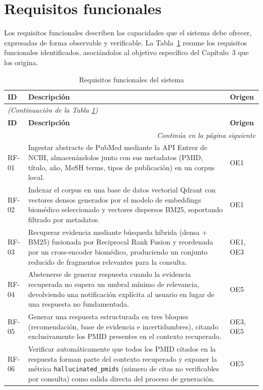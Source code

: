 \documentclass[11pt,a4paper,spanish]{book}
\numberwithin{equation}{chapter}
\numberwithin{figure}{chapter}
\begin{document}
\section{Requisitos funcionales}

Los requisitos funcionales describen las capacidades que el sistema debe ofrecer, expresadas de forma observable y verificable. La Tabla~\ref{tab:rf} resume los requisitos funcionales identificados, asociándolos al objetivo específico del Capítulo~3 que los origina.

{\small
\begin{longtable}{|p{}|p{}|p{}|}
\caption{Requisitos funcionales del sistema}
\label{tab:rf} \\
\hline
\textbf{ID} & \textbf{Descripción} & \textbf{Origen} \\
\hline
\endfirsthead
\multicolumn{3}{l}{\textit{(Continuación de la Tabla \ref{tab:rf})}} \\
\hline
\textbf{ID} & \textbf{Descripción} & \textbf{Origen} \\
\hline
\endhead
\hline
\multicolumn{3}{r}{\textit{Continúa en la página siguiente}} \\
\endfoot
\hline
\endlastfoot
RF-01 & Ingestar abstracts de PubMed mediante la API Entrez de NCBI, almacenándolos junto con sus metadatos (PMID, título, año, MeSH terms, tipos de publicación) en un corpus local. & OE1 \\
\hline
RF-02 & Indexar el corpus en una base de datos vectorial Qdrant con vectores densos generados por el modelo de embeddings biomédico seleccionado y vectores dispersos BM25, soportando filtrado por metadatos. & OE1 \\
\hline
RF-03 & Recuperar evidencia mediante búsqueda híbrida (densa + BM25) fusionada por Reciprocal Rank Fusion y reordenada por un cross-encoder biomédico, produciendo un conjunto reducido de fragmentos relevantes para la consulta. & OE1, OE3 \\
\hline
RF-04 & Abstenerse de generar respuesta cuando la evidencia recuperada no supera un umbral mínimo de relevancia, devolviendo una notificación explícita al usuario en lugar de una respuesta no fundamentada. & OE5 \\
\hline
RF-05 & Generar una respuesta estructurada en tres bloques (recomendación, base de evidencia e incertidumbres), citando exclusivamente los PMID presentes en el contexto recuperado. & OE3, OE5 \\
\hline
RF-06 & Verificar automáticamente que todos los PMID citados en la respuesta forman parte del contexto recuperado y exponer la métrica \texttt{hallucinated\_pmids} (número de citas no verificables por consulta) como salida directa del proceso de generación. & OE5 \\

\end{longtable}}
\end{document}
